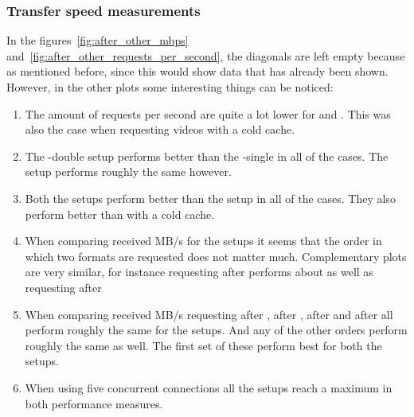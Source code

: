 \documentclass[twoside,openright]{uva-bachelor-thesis}
\begin{document}
\subsubsection{Transfer speed measurements}
In the figures~\ref{fig:after_other_mbps}
and~\ref{fig:after_other_requests_per_second}, the diagonals are left empty
because as mentioned before, since this would show data that has already been
shown. However, in the other plots some interesting things can be noticed:
\begin{enumerate}
    \item
        The amount of requests per second are quite a lot lower for \hds and
        \hls. This was also the case when requesting videos with a cold cache.

    \item
        The \lt-double setup performs better than the \lt-single in all of the
        cases. The \cdn setup performs roughly the same however.

    \item
        Both the \lt setups perform better than the \cdn setup in all of the
        cases. They also perform better than with a cold cache.

    \item
        When comparing received MB/s for the \lt setups it seems that the order
        in which two formats are requested does not matter much. Complementary
        plots are very similar, for instance requesting \dash after \iss
        performs about as well as requesting \iss after \dash

    \item
        When comparing received MB/s requesting \hls after \hds, \hds after
        \hls, \dash after \iss and \iss after \dash all perform roughly the same
        for the \lt setups. And any of the other orders perform roughly the same
        as well. The first set of these perform best for both the \lt setups.

    \item
        When using five concurrent connections all the setups reach a maximum in
        both performance measures.

\end{enumerate}


\FloatBarrier
\end{document}
